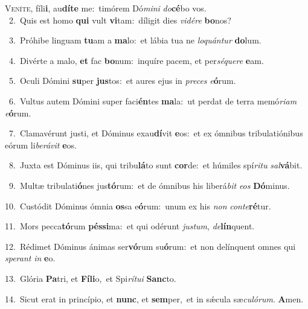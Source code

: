 \lettrine{\initial\textcolor{\initialcolor}{V}}{eníte,} fíli\-\textbf{i}\-, au\-\textbf{dí}\-\textbf{te} me:~\star timórem Dó\-\textit{mi}\-\textit{ni} \textit{do}\-\textbf{cé}bo vos.\\
{\numbfont\textcolor{\numbcolor}{~2.}}~Quis est homo \textbf{qui} vult \textbf{vi}\-tam:~\star díligit dies \textit{vi}\-\textit{dé}\textit{re} \textbf{bo}\-nos?\par
{\numbfont\textcolor{\numbcolor}{~3.}}~Próhibe linguam \textbf{tu}\-am a \textbf{ma}\-lo:~\star et lábia tua ne \textit{lo}\-\textit{quán}\textit{tur} \textbf{do}\-lum.\par
{\numbfont\textcolor{\numbcolor}{~4.}}~Divérte a malo, \textbf{et} fac \textbf{bo}\-num:~\star inquíre pacem, et per\-\textit{sé}\-\textit{que}\textit{re} \textbf{e}\-am.\par
{\numbfont\textcolor{\numbcolor}{~5.}}~Oculi Dómini \textbf{su}\-per \textbf{jus}\-tos:~\star et aures ejus in \textit{pre}\-\textit{ces} \textit{e}\-\textbf{ó}rum.\par
{\numbfont\textcolor{\numbcolor}{~6.}}~Vultus autem Dómini super faci\-\textbf{én}\-tes \textbf{ma}\-la:~\star ut perdat de terra memó\-\textit{ri}\-\textit{am} \textit{e}\-\textbf{ó}rum.\par
{\numbfont\textcolor{\numbcolor}{~7.}}~Clamavérunt justi, et Dóminus exau\-\textbf{dí}\-vit \textbf{e}\-os:~\star et ex ómnibus tribulatiónibus eórum li\-\textit{be}\-\textit{rá}\textit{vit} \textbf{e}\-os.\par
{\numbfont\textcolor{\numbcolor}{~8.}}~Juxta est Dóminus iis, qui tribu\-\textbf{lá}\-to sunt \textbf{cor}\-de:~\star et húmiles spí\-\textit{ri}\-\textit{tu} \textit{sal}\-\textbf{vá}bit.\par
{\numbfont\textcolor{\numbcolor}{~9.}}~Multæ tribulati\-\textbf{ó}\-nes jus\-\textbf{tó}\-rum:~\star et de ómnibus his liberá\textit{bit} \textit{e}\-\textit{os} \textbf{Dó}\-minus.\par
{\numbfont\textcolor{\numbcolor}{10.}}~Custódit Dóminus ómnia \textbf{os}\-sa e\-\textbf{ó}\-rum:~\star unum ex his \textit{non} \textit{con}\-\textit{te}\textbf{ré}tur.\par
{\numbfont\textcolor{\numbcolor}{11.}}~Mors pecca\-\textbf{tó}\-rum \textbf{pés}\-\textbf{si}ma:~\star et qui odérunt \textit{jus}\-\textit{tum}, \textit{de}\-\textbf{lín}quent.\par
{\numbfont\textcolor{\numbcolor}{12.}}~Rédimet Dóminus ánimas ser\-\textbf{vó}\-rum su\-\textbf{ó}\-rum:~\star et non delínquent omnes qui \textit{spe}\-\textit{rant} \textit{in} \textbf{e}\-o.\par
{\numbfont\textcolor{\numbcolor}{13.}}~Glória \textbf{Pa}\-tri, et \textbf{Fí}\-\textbf{li}o,~\star et Spi\-\textit{rí}\-\textit{tu}\textit{i} \textbf{Sanc}\-to.\par
{\numbfont\textcolor{\numbcolor}{14.}}~Sicut erat in princípio, et \textbf{nunc}\-, et \textbf{sem}\-per,~\star et in sǽcula sæ\-\textit{cu}\-\textit{ló}\textit{rum}. \textbf{A}\-men.\par
